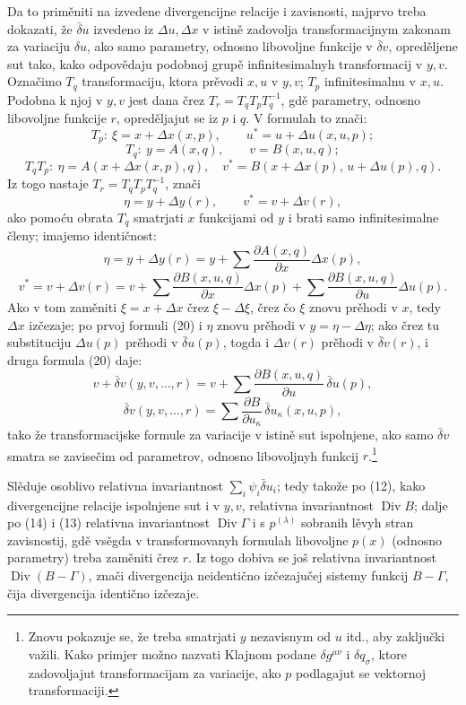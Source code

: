\documentclass[11pt]{article}
\providecommand{\D}{\Delta}
\providecommand{\p}{\partial}
\DeclareMathOperator{\Div}{Div}
\providecommand{\bd}{\bar{\delta}}
\begin{document}
Da to priměniti na izvedene divergencijne relacije i zavisnosti, najprvo treba dokazati, že \(\bd u\) izvedeno iz \(\D u,\D x\) v istině zadovolja transformacijnym zakonam za variaciju \(\delta u\), ako samo parametry, odnosno libovoljne funkcije v \(\bd v\), opreděljene sut tako, kako odpovědaju podobnoj grupě infinitesimalnyh transformacij v \(y,v\). Označimo \(T_q\) transformaciju, ktora prěvodi \(x,u\) v \(y,v\); \(T_p\) infinitesimalnu v \(x,u\). Podobna k njoj v \(y,v\) jest dana črez \(T_r=T_qT_pT_q^{-1}\), gdě parametry, odnosno libovoljne funkcije \(r\), opreděljajut se iz \(p\) i \(q\). V formulah to znači:
\[
T_p:\ \xi=x+\D x(x,p),\qquad u^*=u+\D u(x,u,p);
\]
\[
T_q:\ y=A(x,q),\qquad v=B(x,u,q);
\]
\[
T_qT_p:\ \eta=A(x+\D x(x,p),q),\quad
v^*=B(x+\D x(p),\,u+\D u(p),q).
\]
Iz togo nastaje \(T_r=T_qT_pT_q^{-1}\), znači
\[
\eta=y+\D y(r),\qquad v^*=v+\D v(r),
\]
ako pomoću obrata \(T_q\) smatrjati \(x\) funkcijami od \(y\) i brati samo infinitesimalne členy; imajemo identičnost:
\begin{equation}
\eta=y+\D y(r)=y+\sum\frac{\p A(x,q)}{\p x}\D x(p),
\tag{20a}
\end{equation}
\begin{equation}
v^*=v+\D v(r)=v+\sum\frac{\p B(x,u,q)}{\p x}\D x(p)
+\sum\frac{\p B(x,u,q)}{\p u}\D u(p).
\tag{20b}
\end{equation}
Ako v tom zaměniti \(\xi=x+\D x\) črez \(\xi-\D \xi\), črez čo \(\xi\) znovu prěhodi v \(x\), tedy \(\D x\) izčezaje; po prvoj formuli (20) i \(\eta\) znovu prěhodi v \(y=\eta-\D\eta\); ako črez tu substituciju \(\D u(p)\) prěhodi v \(\bd u(p)\), togda i \(\D v(r)\) prěhodi v \(\bd v(r)\), i druga formula (20) daje:
\[
v+\bd v(y,v,\ldots,r)=v+\sum\frac{\p B(x,u,q)}{\p u}\,\bd u(p),
\]
\[
\bd v(y,v,\ldots,r)=\sum\frac{\p B}{\p u_\kappa}\,\bd u_\kappa(x,u,p),
\]
tako že transformacijske formule za variacije v istině sut ispolnjene, ako samo \(\bd v\) smatra se zavisečim od parametrov, odnosno libovoljnyh funkcij \(r\).\footnote{Znovu pokazuje se, že treba smatrjati \(y\) nezavisnym od \(u\) itd., aby zaključki važili. Kako primjer možno nazvati Klajnom podane \(\delta g^{\mu\nu}\) i \(\delta q_\sigma\), ktore zadovoljajut transformacijam za variacije, ako \(p\) podlagajut se vektornoj transformaciji.}

Slěduje osoblivo relativna invariantnost \(\sum_i\psi_i\bd u_i\); tedy takože po (12), kako divergencijne relacije ispolnjene sut i v \(y,v\), relativna invariantnost \(\Div B\); dalje po (14) i (13) relativna invariantnost \(\Div\Gamma\) i s \(p^{(\lambda)}\) sobranih lěvyh stran zavisnostij, gdě vsěgda v transformovanyh formulah libovoljne \(p(x)\) (odnosno parametry) treba zaměniti črez \(r\). Iz togo dobiva se još relativna invariantnost \(\Div(B-\Gamma)\), znači divergencija neidentično izčezajučej sistemy funkcij \(B-\Gamma\), čija divergencija identično izčezaje.
\end{document}
